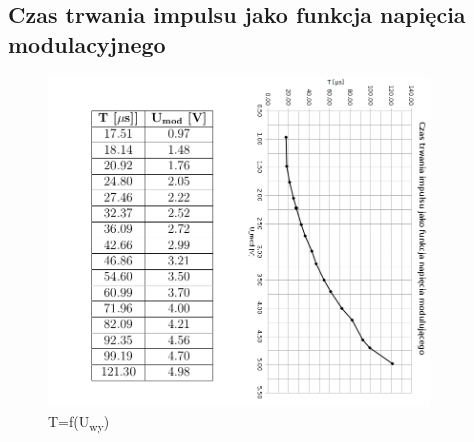 \documentclass[a4paper,12pt]{article}
\begin{document}
\subsection{Czas trwania impulsu jako funkcja napięcia modulacyjnego}
\begin{figure}[h]
  \centering
  \includegraphics[width=0.9\textwidth]{tab2}
  \caption{T=f(U\textsubscript{wy})}
\end{figure}
\end{document}
